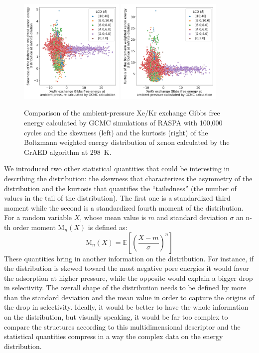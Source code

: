 \documentclass[main]{subfiles}
\begin{document}
\begin{figure}[ht]
  \centering
    \includegraphics[width=0.45\textwidth]{figures/3-fastsim/G_2080_vs_enthalpy_skew_overview.jpg}
    \includegraphics[width=0.45\textwidth]{figures/3-fastsim/G_2080_vs_enthalpy_kurt_overview.jpg}
    \caption{Comparison of the ambient-pressure Xe/Kr exchange Gibbs free energy calculated by GCMC simulations of RASPA with 100,000 cycles and the skewness (left) and the kurtosis (right) of the Boltzmann weighted energy distribution of xenon calculated by the GrAED algorithm at \SI{298}{\kelvin}.}\label{fgr:enthalpy_skew_kurt}
\end{figure}

We introduced two other statistical quantities that could be interesting in describing the distribution: the skewness that characterizes the asymmetry of the distribution and the kurtosis that quantifies the ``tailedness'' (the number of values in the tail of the distribution). The first one is a standardized third moment while the second is a standardized fourth moment of the distribution. For a random variable $X$, whose mean value is $m$ and standard deviation $\sigma$ an n-th order moment $\text{M}_{n}(X)$ is defined as:
\begin{equation}
  \text{M}_n(X) = \mathbb{E}\left[{\left(\dfrac{X-m}{\sigma}\right)}^n\right]
\end{equation}
These quantities bring in another information on the distribution. For instance, if the distribution is skewed toward the most negative pore energies it would favor the adsorption at higher pressure, while the opposite would explain a bigger drop in selectivity. The overall shape of the distribution needs to be defined by more than the standard deviation and the mean value in order to capture the origins of the drop in selectivity. Ideally, it would be better to have the whole information on the distribution, but visually speaking, it would be far too complex to compare the structures according to this multidimensional descriptor and the statistical quantities compress in a way the complex data on the energy distribution.
\end{document}
